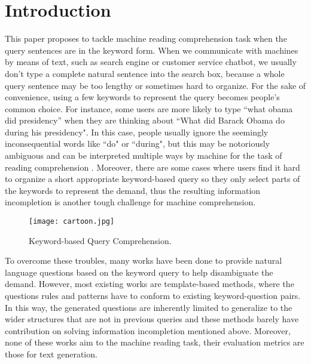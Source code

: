 \documentclass[sigconf]{acmart}
\begin{document}
\section{Introduction}
This paper proposes to tackle machine reading comprehension task when the query sentences are in the keyword form. When we communicate with machines by means of text, such as search engine or customer service chatbot, we usually don't type a complete natural sentence into the search box, because a whole query sentence may be too lengthy or sometimes hard to organize. For the sake of convenience, using a few keywords to represent the query becomes people's common choice. For instance, some users are more likely to type ``what obama did presidency'' when they are thinking about ``What did Barack Obama do during his presidency". In this case, people usually ignore the seemingly inconsequential words like  ``do" or ``during", but this may be notoriously ambiguous and can be interpreted multiple ways by machine for the task of reading comprehension\cite{bender2013linguistic} \cite{voorhees1999natural}. Moreover, there are  some cases where users find it hard to organize a short appropriate keyword-based query so they only select parts of the keywords to represent the demand, thus the resulting information incompletion is another tough challenge for machine comprehension.

\begin{figure}[t]
  \begin{center}
  \texttt{[image: cartoon.jpg]}
  \caption{Keyword-based Query Comprehension.}
  \end{center}
\end{figure}



To overcome these troubles, many works have been done to provide natural language questions based on the keyword query to help disambiguate the demand\cite{Dror2013From}\cite{Zhao2011Automatically}\cite{37566}. However, most existing works are template-based methods, where the questions rules and patterns have to conform to existing keyword-question pairs. In this way, the generated questions are inherently limited to generalize to the wider structures that are not in previous queries and these methods barely have contribution on solving information incompletion mentioned above. Moreover, none of these works aim to the machine reading task, their evaluation metrics are those for text generation.
\end{document}
